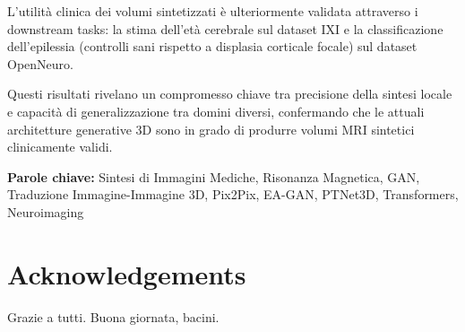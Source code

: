 \documentclass[11pt,a4paper]{article}
\begin{document}
L'utilità clinica dei volumi sintetizzati è ulteriormente validata attraverso i downstream tasks: la stima dell'età cerebrale sul dataset IXI e la classificazione dell'epilessia (controlli sani rispetto a displasia corticale focale) sul dataset OpenNeuro.

Questi risultati rivelano un compromesso chiave tra precisione della sintesi locale e capacità di generalizzazione tra domini diversi, confermando che le attuali architetture generative 3D sono in grado di produrre volumi MRI sintetici clinicamente validi.
\vspace{15pt}
\begin{tcolorbox}[arc=0pt, boxrule=0pt, colback=bluePoli!60, width=\textwidth, colupper=white]
    \textbf{Parole chiave:} Sintesi di Immagini Mediche, Risonanza Magnetica, GAN, Traduzione Immagine-Immagine 3D, Pix2Pix, EA-GAN, PTNet3D, Transformers, Neuroimaging 
\end{tcolorbox}

\section*{Acknowledgements}
Grazie a tutti. Buona giornata, bacini.

\end{document}
